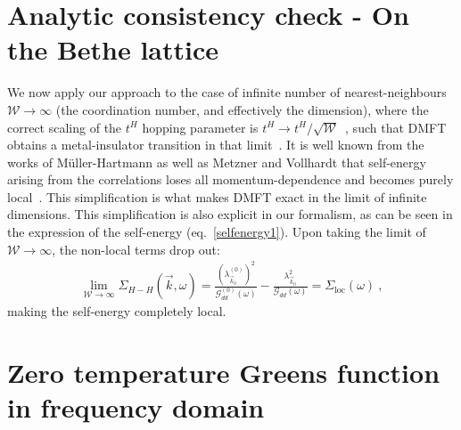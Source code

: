 \documentclass[prb]{revtex4-2}
\begin{document}
\section{Analytic consistency check - On the Bethe lattice}
We now apply our approach to the case of infinite number of nearest-neighbours $\mathcal{W}\to\infty$ (the coordination number, and effectively the dimension), where the correct scaling of the $t^{H}$ hopping parameter is $t^{H}\to t^{H}/\sqrt{\mathcal{W}}$~\cite{metzner_volhardt_1989,georges_kotliar_1992,pruschke_cox_jarrel_1993}, such that DMFT obtains a metal-insulator transition in that limit~\cite{georges1996}. It is well known from the works of Müller-Hartmann as well as Metzner and Vollhardt that self-energy arising from the correlations loses all momentum-dependence and becomes purely local~\cite{Muller-Hartmann1989,metzner_volhardt_1989}. This simplification is what makes DMFT exact in the limit of infinite dimensions. This simplification is also explicit in our formalism, as can be seen in the expression of the self-energy (eq.~\ref{selfenergy1}). Upon taking the limit of \(\mathcal{W}\to\infty\), the non-local terms drop out:
\begin{equation}\begin{aligned}
	\lim_{\mathcal{W}\to\infty}\Sigma_{H-H}(\vec k,\omega) = \frac{\left(\lambda_{\vec k_0}^{(0)}\right)^2}{\mathcal{G}^{(0)}_{dd}(\omega)} - \frac{\lambda_{\vec k_0}^2}{\mathcal{G}_{dd}(\omega)} = \Sigma_\text{loc}(\omega)~,
\end{aligned}\end{equation}
making the self-energy completely local.

\appendix

\section{Zero temperature Greens function in frequency domain}
\end{document}

